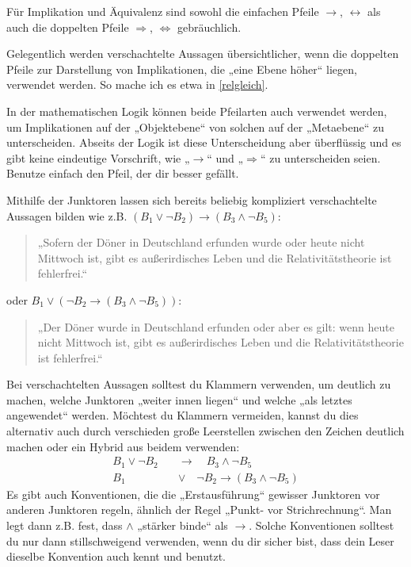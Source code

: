 	
\begin{bem}
    Für Implikation und Äquivalenz sind sowohl die einfachen Pfeile $\to$, $\leftrightarrow$ als auch die doppelten Pfeile $\Rightarrow$, $\Leftrightarrow$ gebräuchlich.
    
    Gelegentlich werden verschachtelte Aussagen übersichtlicher, wenn die doppelten Pfeile zur Darstellung von Implikationen, die „eine Ebene höher“ liegen, verwendet werden. So mache ich es etwa in \cref{relgleich}.
    
    In der mathematischen Logik können beide Pfeilarten auch verwendet werden, um Implikationen auf der „Objektebene“ von solchen auf der „Metaebene“ zu unterscheiden. Abseits der Logik ist diese Unterscheidung aber überflüssig und es gibt keine eindeutige Vorschrift, wie „$\to$“ und „$\Rightarrow$“ zu unterscheiden seien. Benutze einfach den Pfeil, der dir besser gefällt.
\end{bem}

	
\begin{bem}
    Mithilfe der Junktoren lassen sich bereits beliebig kompliziert verschachtelte Aussagen bilden wie z.B. $(B_1\lor \neg B_2) \to (B_3\land \neg B_5)$:
    \begin{quote}
        „Sofern der Döner in Deutschland erfunden wurde oder heute nicht Mittwoch ist, gibt es außerirdisches Leben und die Relativitätstheorie ist fehlerfrei.“
    \end{quote}
    oder $B_1\lor (\neg B_2 \to (B_3\land \neg B_5))$:
    \begin{quote}
        „Der Döner wurde in Deutschland erfunden oder aber es gilt: wenn heute nicht Mittwoch ist, gibt es außerirdisches Leben und die Relativitätstheorie ist fehlerfrei.“
    \end{quote}
    Bei verschachtelten Aussagen solltest du Klammern verwenden, um deutlich zu machen, welche Junktoren „weiter innen liegen“ und welche „als letztes angewendet“ werden. Möchtest du Klammern vermeiden, kannst du dies alternativ auch durch verschieden große Leerstellen zwischen den Zeichen deutlich machen oder ein Hybrid aus beidem verwenden:
    \begin{align*}
        B_1\lor \neg B_2\quad &\to \quad B_3\land \neg B_5 \\[0.5em]
        B_1\quad  &\lor \quad \neg B_2 \to (B_3\land \neg B_5)
    \end{align*}
    Es gibt auch Konventionen, die die „Erstausführung“ gewisser Junktoren vor anderen Junktoren regeln, ähnlich der Regel „Punkt- vor Strichrechnung“. Man legt dann z.B. fest, dass $\land$ „stärker binde“ als $\to$. Solche Konventionen solltest du nur dann stillschweigend verwenden, wenn du dir sicher bist, dass dein Leser dieselbe Konvention auch kennt und benutzt.
\end{bem}

